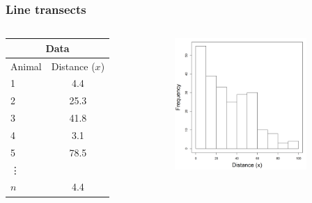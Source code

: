\documentclass[color=usenames,dvipsnames]{beamer}\usepackage[]{graphicx}\usepackage[]{color}
\begin{document}
\begin{frame}
  \frametitle{Line transects}
  \begin{columns}
    \begin{column}{0.4\textwidth}
      \centering
      \normalsize
      \begin{tabular}{lc}
        \hline
        \multicolumn{2}{c}{Data} \\
        \hline
        Animal & Distance ($x$) \\
        \hline
        1 & 4.4 \\
        2 & 25.3 \\
        3 & 41.8 \\
        4 & 3.1 \\
        5 & 78.5 \\
        \vdots \\
        $n$ & 4.4 \\
        \hline
      \end{tabular}
    \end{column}
    \begin{column}{0.6\textwidth}
      \centering
      \includegraphics[width=5cm]{figs/example1}
    \end{column}
  \end{columns}

\end{frame}
\end{document}
